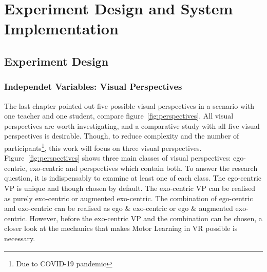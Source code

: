 \chapter{Experiment Design and System Implementation}
\label{chapter:studysetting_conduction}
\section{Experiment Design}
\label{section:study}

\subsection{Independet Variables: Visual Perspectives}
The last chapter pointed out five possible visual perspectives in a scenario with one teacher and one student, compare figure~\ref{fig:perspectives}. All visual perspectives are worth investigating, and a comparative study with all five visual perspectives is desirable. Though, to reduce complexity and the number of participants\footnote{Due to COVID-19 pandemic}, this work will focus on three visual perspectives.\\
Figure~\ref{fig:perspectives} shows three main classes of visual perspectives: ego-centric, exo-centric and perspectives which contain both. To answer the research question, it is indispensably to examine at least one of each class. The ego-centric VP is unique and though chosen by default. The exo-centric VP can be realised as purely exo-centric or augmented exo-centric. The combination of ego-centric and exo-centric can be realised as ego \& exo-centric or ego \& augmented exo-centric. However, before the exo-centric VP and the combination can be chosen, a closer look at the mechanics that makes Motor Learning in VR possible is necessary.


